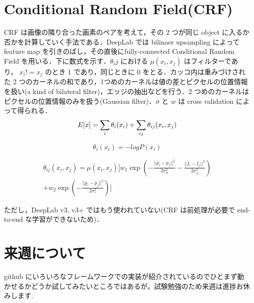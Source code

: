 \documentclass[onecolumn]{ujarticle}   %
\begin{document}
	\section{Conditional Random Field(CRF)}
	CRF は画像の隣り合った画素のペアを考えて，その 2 つが同じ object に入るか否かを計算していく手法である．DeepLab では bilinaer upsampling によって feature map を引きのばし，その直後にfully-connected Conditional Random Field を用いる．下に数式を示す．$\theta_{i}{j}$ における $\mu(x_{i},x_{j})$ はフィルターであり， $x_{i} != x_{j}$ のとき 1 であり，同じときに 0 をとる．カッコ内は重みづけされた 2 つのカーネルの和であり，1つめのカーネルは値の差とピクセルの位置情報を扱い(a kind of bilateral filter)，エッジの抽出などを行う．2 つめのカーネルはピクセルの位置情報のみを扱う(Gaussian filter)．$\sigma$ と $w$ は cross validation によって得られる．
	\begin{equation*}
	E[x] = \sum_{i}\theta_{i}(x_{i})+\sum_{ij}\theta_{ij}(x_{i},x_{j})\\
	\end{equation*}
	
	\begin{equation*}
	\theta_{i}(x_{i}) = -logP(x_{i})
	\end{equation*}
	
	\begin{eqnarray*}
	\theta_{ij}(x_{i},x_{j}) = \mu(x_{i},x_{j})[w_{1}\exp(-\frac{||p_{i}-p_{j}||^2}{2\sigma_{\alpha}^2}-\frac{||I_{i}-I_{j}||^2}{2\sigma_{\beta}^2})\\+w_{2}\exp(-\frac{||p_{i}-p_{j}||^2}{2\sigma_{\gamma}^2})]
	\end{eqnarray*}
	
	ただし，DeepLab v3, v3+ ではもう使われていない(CRF は前処理が必要で end-to-end な学習ができないため)．
	
	\section{来週について}
	github にいろいろなフレームワークでの実装が紹介されているのでひとまず動かせるかどうか試してみたいところではあるが，試験勉強のため来週は進捗お休みします.
	
	
	
\end{document}
